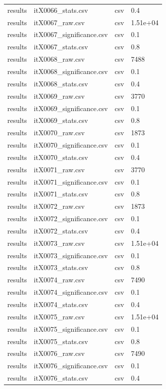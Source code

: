 \begin{landscape}
\begin{longtable}{p{}p{}p{}p{}}
results & itX0066\_stats.csv & csv & 0.4 \\
results & itX0067\_raw.csv & csv & 1.51e+04 \\
results & itX0067\_significance.csv & csv & 0.1 \\
results & itX0067\_stats.csv & csv & 0.8 \\
results & itX0068\_raw.csv & csv & 7488 \\
results & itX0068\_significance.csv & csv & 0.1 \\
results & itX0068\_stats.csv & csv & 0.4 \\
results & itX0069\_raw.csv & csv & 3770 \\
results & itX0069\_significance.csv & csv & 0.1 \\
results & itX0069\_stats.csv & csv & 0.8 \\
results & itX0070\_raw.csv & csv & 1873 \\
results & itX0070\_significance.csv & csv & 0.1 \\
results & itX0070\_stats.csv & csv & 0.4 \\
results & itX0071\_raw.csv & csv & 3770 \\
results & itX0071\_significance.csv & csv & 0.1 \\
results & itX0071\_stats.csv & csv & 0.8 \\
results & itX0072\_raw.csv & csv & 1873 \\
results & itX0072\_significance.csv & csv & 0.1 \\
results & itX0072\_stats.csv & csv & 0.4 \\
results & itX0073\_raw.csv & csv & 1.51e+04 \\
results & itX0073\_significance.csv & csv & 0.1 \\
results & itX0073\_stats.csv & csv & 0.8 \\
results & itX0074\_raw.csv & csv & 7490 \\
results & itX0074\_significance.csv & csv & 0.1 \\
results & itX0074\_stats.csv & csv & 0.4 \\
results & itX0075\_raw.csv & csv & 1.51e+04 \\
results & itX0075\_significance.csv & csv & 0.1 \\
results & itX0075\_stats.csv & csv & 0.8 \\
results & itX0076\_raw.csv & csv & 7490 \\
results & itX0076\_significance.csv & csv & 0.1 \\
results & itX0076\_stats.csv & csv & 0.4 \\

\end{longtable}
\end{landscape}
